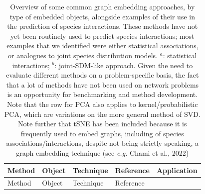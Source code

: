 \documentclass[11pt]{article}
\begin{document}
\hypertarget{tbl:methods}{}
\begin{longtable}[]{@{}lllll@{}}
\caption{\label{tbl:methods}Overview of some common graph embedding
approaches, by type of embedded objects, alongside examples of their use
in the prediction of species interactions. These methods have not yet
been routinely used to predict species interactions; most examples that
we identified were either statistical associations, or analogues to
joint species distribution models. \(^a\): statistical interactions;
\(^b\): joint-SDM-like approach. Given the need to evaluate different
methods on a problem-specific basis, the fact that a lot of methods have
not been used on network problems is an opportunity for benchmarking and
method development. Note that the row for PCA also applies to
kernel/probabilistic PCA, which are variations on the more general
method of SVD. Note further that tSNE has been included because it is
frequently used to embed graphs, including of species
associations/interactions, despite not being strictly speaking, a graph
embedding technique (see \emph{e.g.} Chami et al., 2022)}\tabularnewline
\toprule
\begin{minipage}[b]{0.09\columnwidth}\raggedright
Method\strut
\end{minipage} & \begin{minipage}[b]{0.11\columnwidth}\raggedright
Object\strut
\end{minipage} & \begin{minipage}[b]{0.23\columnwidth}\raggedright
Technique\strut
\end{minipage} & \begin{minipage}[b]{0.14\columnwidth}\raggedright
Reference\strut
\end{minipage} & \begin{minipage}[b]{0.29\columnwidth}\raggedright
Application\strut
\end{minipage}\tabularnewline
\midrule
\endfirsthead
\toprule
\begin{minipage}[b]{0.09\columnwidth}\raggedright
Method\strut
\end{minipage} & \begin{minipage}[b]{0.11\columnwidth}\raggedright
Object\strut
\end{minipage} & \begin{minipage}[b]{0.23\columnwidth}\raggedright
Technique\strut
\end{minipage} & \begin{minipage}[b]{0.14\columnwidth}\raggedright
Reference\strut
\end{minipage} & \begin{minipage}[b]{0.29\columnwidth}\raggedright

\end{minipage}
\end{longtable}
\end{document}
